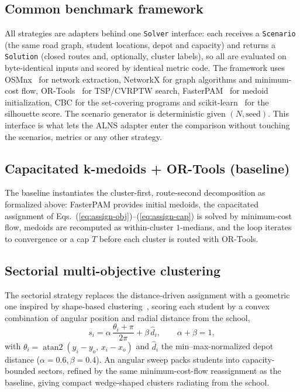 \documentclass[graybox]{SNmult}
\begin{document}
\subsection{Common benchmark framework}\label{sec:framework}
All strategies are adapters behind one \texttt{Solver} interface: each
receives a \texttt{Scenario} (the same road graph, student locations,
depot and capacity) and returns a \texttt{Solution} (closed routes and,
optionally, cluster labels), so all are evaluated on byte-identical inputs
and scored by identical metric code. The framework uses
OSMnx~\cite{Boeing2017OSMnx} for network extraction, NetworkX for graph
algorithms and minimum-cost flow, OR-Tools~\cite{PerronFurnon2023ORTools}
for TSP/CVRPTW search, FasterPAM~\cite{KaufmanRousseeuw1990PAM} for medoid
initialization, CBC for the set-covering programs and
scikit-learn~\cite{Pedregosa2011Sklearn} for the silhouette score. The
scenario generator is deterministic given $(N,\text{seed})$. This
interface is what lets the ALNS adapter enter the comparison without
touching the scenarios, metrics or any other strategy.

\subsection{Capacitated k-medoids + OR-Tools (baseline)}
The baseline instantiates the cluster-first, route-second decomposition as
formalized above: FasterPAM provides initial medoids, the capacitated
assignment of Eqs.~(\ref{eq:assign-obj})--(\ref{eq:assign-cap}) is solved
by minimum-cost flow, medoids are recomputed as within-cluster
$1$-medians, and the loop iterates to convergence or a cap $T$ before each
cluster is routed with OR-Tools.

\subsection{Sectorial multi-objective clustering}
The sectorial strategy replaces the distance-driven assignment with a
geometric one inspired by shape-based
clustering~\cite{CakirRevisitingProblem}, scoring each student by a convex
combination of angular position and radial distance from the school,
\begin{equation}
s_i=\alpha\,\frac{\theta_i+\pi}{2\pi}+\beta\,\hat d_i,
\qquad \alpha+\beta=1,
\label{eq:sectorial-score}
\end{equation}
with $\theta_i=\operatorname{atan2}(y_i-y_o,\,x_i-x_o)$ and $\hat d_i$ the
min--max-normalized depot distance ($\alpha=0.6,\beta=0.4$). An angular
sweep packs students into capacity-bounded sectors, refined by the same
minimum-cost-flow reassignment as the baseline, giving compact
wedge-shaped clusters radiating from the school.
\end{document}
